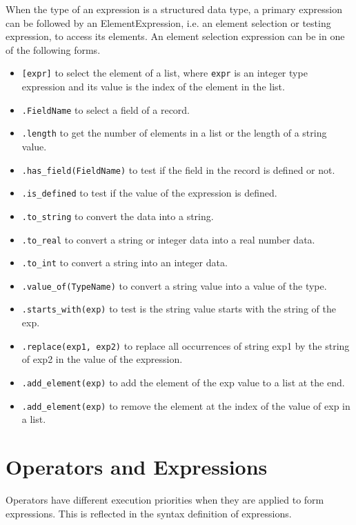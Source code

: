 \documentclass[english]{report}
\newcommand{\comment}[1]{
   \marginpar{
   \flushleft{
   \footnotesize{
   \textit{\color{red} 
   #1 
   }}}}}
\begin{document}
When the type of an expression is a structured data type, a primary expression can be followed by an ElementExpression, i.e. an element selection or testing expression, to access its elements. An element selection expression can be in one of the following forms. 
\begin{itemize}
\item \texttt{[expr]} to select the element of a list, where \texttt{expr} is an integer type expression and its value is the index of the element in the list. 
\item \texttt{.FieldName} to select a field of a record.  
\item \texttt{.length} to get the number of elements in a list or the length of a string value.
\item \texttt{.has\_field(FieldName)} to test if the field in the record is defined or not. 
\item \texttt{.is\_defined} to test if the value of the expression is defined. 
\item \texttt{.to\_string} to convert the data into a string. 
\item \texttt{.to\_real} to convert a string or integer data into a real number data. 
\item \texttt{.to\_int} to convert a string into an integer data. 
\item \texttt{.value\_of(TypeName)} to convert a string value into a value of the type.
\item \texttt{.starts\_with(exp)} to test is the string value starts with the string of the exp.
\item \texttt{.replace(exp1, exp2)} to replace all occurrences of string exp1 by the string of exp2 in the value of the expression. 
\item \texttt{.add\_element(exp)} to add the element of the exp value to a list at the end. 
\item \texttt{.add\_element(exp)} to remove the element at the index of the value of exp in a list. 
\end{itemize}

\section{Operators and Expressions}

Operators have different execution priorities when they are applied to form expressions. This is reflected in the syntax definition of expressions.  
\end{document}
